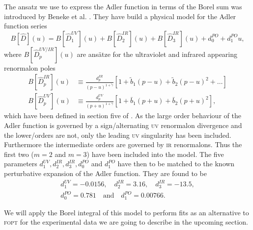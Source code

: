\documentclass[../../index.tex]{subfiles}
\begin{document}
The ansatz we use to express the Adler function in terms of the Borel sum was
introduced by Beneke et al. \cite{Beneke2008}. They have build a physical model
for the Adler function series
\begin{equation}
  \label{eq:borelModel}
  B[\widehat D](u) = B[\widehat D_1^{UV}](u) + B[\widehat D_2^{IR}](u) + B[\widehat D_3^{IR}](u) + d_0^{PO} + d_1^{PO}u,
\end{equation}
where \(B[\widehat D_p^{UV/IR}](u)\) are ansätze for the ultraviolet and
infrared appearing renormalon poles
\begin{align}
  B[\widehat D_p^{IR}](u)
  &\equiv \frac{d_p^{IR}}{(p-u)^{1+\tilde \gamma}}
    \left[  1 + \tilde b_1(p-u) + \tilde b_2(p-u)^2 + \dots \right] \\
  B[\widehat D_p^{UV}](u) &\equiv \frac{d_p^{UV}}{(p+u)^{1+\bar\gamma}}\left[1 + \bar b_1(p+u) + \bar b_2(p+u)^2 \right],
\end{align}
which have been defined in section five of \cite{Beneke2008}. As the large order
behaviour of the Adler function is governed by a sign\-/alternating \textsc{uv}
renormalon divergence and the lower\-/orders are not, only the leading
\textsc{uv} singularity has been included. Furthermore the intermediate orders
are governed by \textsc{ir} renormalons. Thus the first two (\(m=2\) and
\(m=3\)) have been included into the model. The five parameters \(d_1^{UV},
d_2^{IR}, d_3^{IR}, d_0^{PO}\) and \(d_1^{PO}\) have then to be matched to the
known perturbative expansion of the Adler function. They are found to be
\cite{Beneke2008}
\begin{equation}
  \begin{split}
    d_1^{UV} = -0.0156, \quad d_2^{IR} = 3.16, \quad d_3^{IR} = -13.5, \\
    d_0^{PO} = 0.781 \quad \text{and} \quad d_1^{PO} = 0.00766.
  \end{split}
\end{equation}

We will apply the Borel integral of this model to perform fits as an
alternative to \textsc{fopt} for the experimental data we are going to describe
in the upcoming section.
\end{document}
